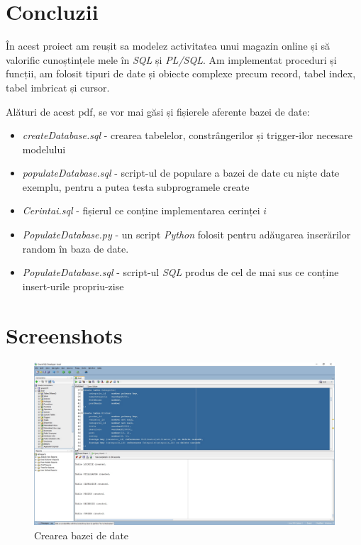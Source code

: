 \documentclass[12pt]{article}
\begin{document}
\section{Concluzii}
În acest proiect am reușit sa modelez activitatea unui magazin online și să valorific cunoștințele mele în 
\textit{SQL} și \textit{PL/SQL}. Am implementat proceduri și funcții, am folosit tipuri de date și obiecte 
complexe precum record, tabel index, tabel imbricat și cursor.

Alături de acest pdf, se vor mai găsi și fișierele aferente bazei de date:

\begin{itemize}
  \item \textit{createDatabase.sql} - crearea tabelelor, constrângerilor și trigger-ilor necesare modelului
  \item \textit{populateDatabase.sql} - script-ul de populare a bazei de date cu niște date exemplu, pentru
        a putea testa subprogramele create
  \item \textit{Cerintai.sql} - fișierul ce conține implementarea cerinței $i$
  \item \textit{PopulateDatabase.py} - un script \textit{Python} folosit pentru adăugarea inserărilor random
        în baza de date.
  \item \textit{PopulateDatabase.sql} - script-ul \textit{SQL} produs de cel de mai sus ce conține insert-urile propriu-zise
\end{itemize}

\pagebreak


\section{Screenshots}

\begin{figure}[htp]
\centering
\includegraphics[width=1\linewidth]{Creare.jpg}
\caption{Crearea bazei de date}
\end{figure}
\end{document}
